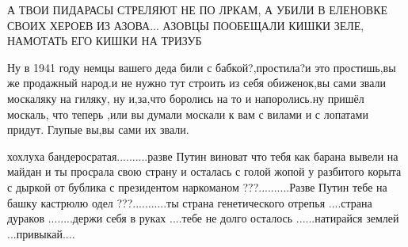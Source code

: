 А ТВОИ ПИДАРАСЫ СТРЕЛЯЮТ НЕ ПО ЛРКАМ, А УБИЛИ В ЕЛЕНОВКЕ СВОИХ ХЕРОЕВ ИЗ
АЗОВА... АЗОВЦЫ ПООБЕЩАЛИ КИШКИ ЗЕЛЕ, НАМОТАТЬ ЕГО КИШКИ НА ТРИЗУБ


Ну в 1941 году немцы вашего деда били с бабкой?,простила?и это простишь,вы же
продажный народ.и не нужно тут строить из себя обиженок,вы сами звали москаляку
на гиляку, ну и,за,что боролись на то и напоролись.ну пришёл москаль, что
теперь ,или вы думали москали к вам с вилами и с лопатами придут. Глупые вы,вы
сами их звали.

хохлуха бандеросратая..........разве Путин виноват что тебя как барана вывели
на майдан и ты просрала свою страну и осталась с голой жопой у разбитого корыта
с  дыркой  от  бублика  с президентом наркоманом ???..........Разве Путин тебе
на башку кастрюлю одел ???...........ты страна генетического отрепья ....страна
дураков ........держи себя в руках ....тебе не долго осталось ......натирайся
землей ...привыкай....
